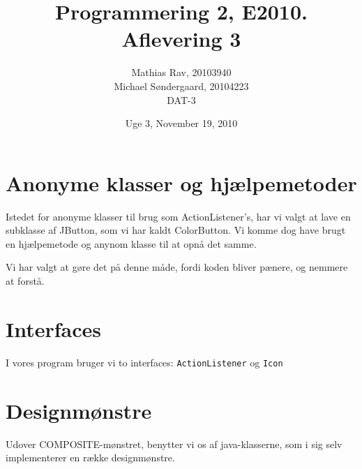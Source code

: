 \documentclass[12pt,a4paper]{article}
\begin{document}
\title{Programmering 2, E2010. Aflevering 3}
\author{Mathias Rav, 20103940 \\
		Michael Søndergaard, 20104223 \\
		DAT-3}
\date{Uge 3, November 19, 2010}
\maketitle


\section{Anonyme klasser og hjælpemetoder}
Istedet for anonyme klasser til brug som ActionListener's, har vi valgt at 
lave en subklasse af JButton, som vi har kaldt ColorButton. Vi komme dog 
have brugt en hjælpemetode og anynom klasse til at opnå det samme.

Vi har valgt at gøre det på denne måde, fordi koden bliver pænere, og nemmere
at forstå. 

\section{Interfaces}
I vores program bruger vi to interfaces: \texttt{ActionListener} og \texttt{Icon} 

\section{Designmønstre}
Udover COMPOSITE-mønstret, benytter vi os af java-klasserne, som i sig selv 
implementerer en række designmønstre.
\end{document}
